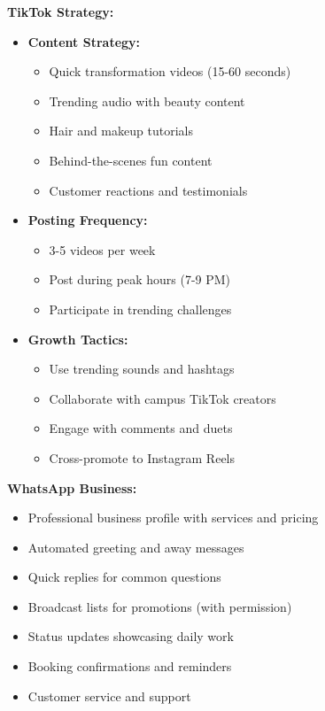 \textbf{TikTok Strategy:}
\begin{itemize}[leftmargin=2em]
    \item \textbf{Content Strategy:}
    \begin{itemize}
        \item Quick transformation videos (15-60 seconds)
        \item Trending audio with beauty content
        \item Hair and makeup tutorials
        \item Behind-the-scenes fun content
        \item Customer reactions and testimonials
    \end{itemize}
    
    \item \textbf{Posting Frequency:}
    \begin{itemize}
        \item 3-5 videos per week
        \item Post during peak hours (7-9 PM)
        \item Participate in trending challenges
    \end{itemize}
    
    \item \textbf{Growth Tactics:}
    \begin{itemize}
        \item Use trending sounds and hashtags
        \item Collaborate with campus TikTok creators
        \item Engage with comments and duets
        \item Cross-promote to Instagram Reels
    \end{itemize}
\end{itemize}

\textbf{WhatsApp Business:}
\begin{itemize}[leftmargin=2em]
    \item Professional business profile with services and pricing
    \item Automated greeting and away messages
    \item Quick replies for common questions
    \item Broadcast lists for promotions (with permission)
    \item Status updates showcasing daily work
    \item Booking confirmations and reminders
    \item Customer service and support
\end{itemize}

